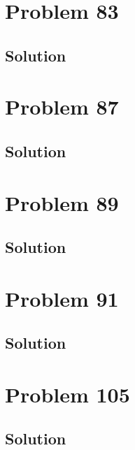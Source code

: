 \documentclass[12pt]{article}
\begin{document}
    \pagebreak
    \section{Problem 83}

        \subsection{Solution}

    \pagebreak
    \section{Problem 87}

        \subsection{Solution}

    \pagebreak
    \section{Problem 89}

        \subsection{Solution}

    \pagebreak
    \section{Problem 91}

        \subsection{Solution}

    \pagebreak
    \section{Problem 105}

        \subsection{Solution}

    \pagebreak
    \tableofcontents
\end{document}
